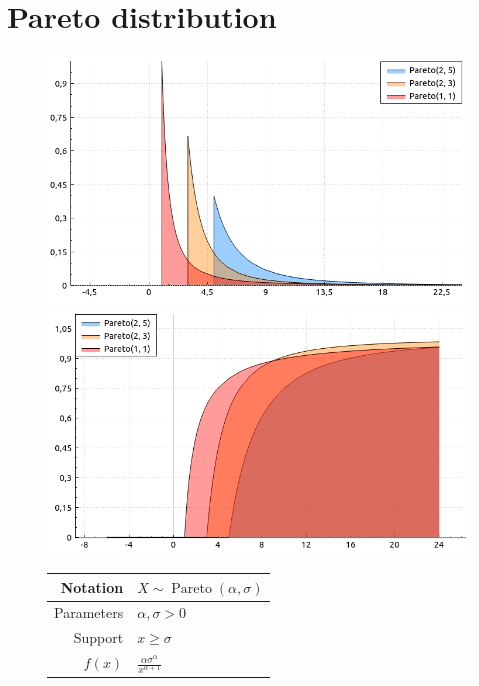 \documentclass[a4paper,11pt]{article}
\theoremstyle{plain}
\theoremstyle{definition}
\begin{document}
\section{Pareto distribution}
			\begin{figure}[!htb]\centering
				\begin{minipage}{0.55\textwidth}
					\includegraphics[width=\linewidth, right]{pareto_pdf}
					\captionsetup{labelformat=empty}
					\includegraphics[width=\linewidth, right]{pareto_cdf}
					\captionsetup{labelformat=empty}
				\end{minipage}
				\begin{minipage}{0.4\textwidth}
					\begin{tabular}{| r | l |}
						\hline
						Notation & $X \sim \operatorname{Pareto}(\alpha, \sigma)$ \\
						\hline
						Parameters & $\alpha,  \sigma > 0 $ \\
						\hline
						Support & $x \geq \sigma$  \\
						\hline
						$f(x)$ & $ \frac{\alpha \sigma^\alpha}{x^{\alpha+1}}  $ \\

\end{tabular}
\end{minipage}
\end{figure}
\end{document}
